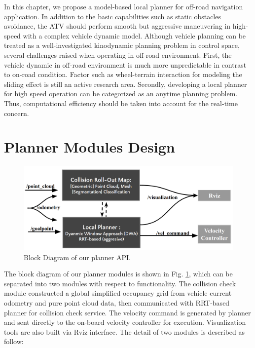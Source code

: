 \documentclass[../thesis.tex]{subfiles}
\begin{document}
In this chapter, we propose a model-based local planner for off-road navigation application. In addition to the basic capabilities such as static obstacles avoidance, the ATV should perform smooth but aggressive maneuvering in high-speed with a complex vehicle dynamic model. Although vehicle planning can be treated as a well-investigated kinodynamic planning problem in control space, several challenges raised when operating in off-road environment. First, the vehicle dynamic in off-road environment is much more unpredictable in contrast to on-road condition. Factor such as wheel-terrain interaction for modeling the sliding effect is still an active research area. Secondly, developing a local planner for high speed operation can be categorized as an anytime planning problem. Thus, computational efficiency should be taken into account for the real-time concern.

\section{Planner Modules Design}

\begin{figure}[t]
	\begin{center}
		\centerline{\includegraphics[width=0.8\columnwidth]{./RRTPlanner/fig/planner_module.png}}
		\caption{Block Diagram of our planner API.}
		\label{fig:planner_module}
	\end{center}
\end{figure} 

The block diagram of our planner modules is shown in Fig. \ref{fig:planner_module}, which can be separated into two modules with respect to functionality. The collision check module constructed a global simplified occupancy grid from vehicle current odometry and pure point cloud data, then communicated with RRT-based planner for collision check service. The velocity command is generated by planner and sent directly to the on-board velocity controller for execution. Visualization tools are also built via Rviz interface. The detail of two modules is described as follow:
\end{document}
